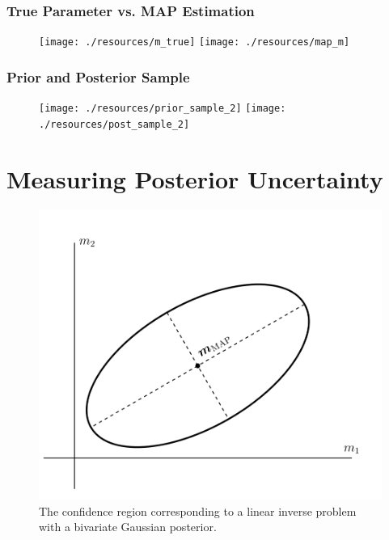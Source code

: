 \documentclass[
  pdf,
  10pt,
  xcolor={svgnames},
]{beamer}
\begin{document}
\begin{frame}
  \frametitle{True Parameter vs. MAP Estimation}
  \begin{figure}
    \centering
    \texttt{[image: ./resources/m\_true]}
    \texttt{[image: ./resources/map\_m]}
  \end{figure}
\end{frame}
\begin{frame}
  \frametitle{Prior and Posterior Sample}
  \begin{figure}
    \centering
    \texttt{[image: ./resources/prior\_sample\_2]}
    \texttt{[image: ./resources/post\_sample\_2]}
  \end{figure}
\end{frame}

\section{Measuring Posterior Uncertainty}
\begin{frame}
  \begin{figure}
    \centering
    \includegraphics[width=.65\textwidth]{./resources/bivariate}
    \caption{
      The confidence region corresponding to a linear inverse problem with a
      bivariate Gaussian posterior.
    }
  \end{figure}
\end{frame}
\end{document}
